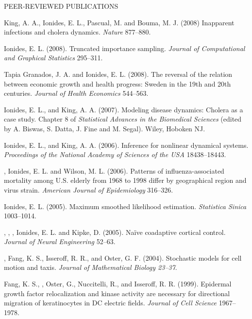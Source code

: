 \begin{reflist}{PEER-REVIEWED PUBLICATIONS}
\item\formal{[[\kingNATURE] ]}
King, A. A., Ionides, E. L., Pascual, M. and Bouma, M. J. (2008) Inapparent infections and cholera dynamics. {\em Nature} {}{\separator}877--880.

\item\formal{[[\ionidesJCGS] ]}
Ionides, E. L. (2008). Truncated importance sampling. {\em Journal of Computational and Graphical Statistics} {}{\separator}295--311.

\item\formal{[[\tapiaJHE] ]} 
Tapia Granados, J. A. and Ionides, E. L. (2008). The reversal of the relation between economic growth and health progress: Sweden in the 19th and 20th centuries. {\em Journal of Health Economics} {}{\separator}544--563.

\item\formal{[[\ionidesBOOK] ]}  
Ionides, E. L.,  and King, A. A. (2007). 
 Modeling disease dynamics: Cholera as a case study.
 Chapter 8 of {\em  Statistical Advances in the Biomedical Sciences} (edited by A. Biswas, S. Datta, J. Fine and M. Segal). Wiley, Hoboken NJ.


\item\formal{[[\ionidesPNAS] ]}  
Ionides, E. L.,  and King, A. A. (2006). 
 Inference for nonlinear dynamical systems.
 {\em Proceedings of the National Academy of Sciences of the USA} {}{\separator}18438--18443.


\item\formal{[[\greeneAJE] ]} 
, Ionides, E. L. and Wilson,
  M. L. (2006). Patterns of influenza-associated mortality among
  U.S. elderly from 1968 to 1998 differ by geographical region
  and virus strain. {\em American Journal of
  Epidemiology} {}{\separator}316--326. 


\item\formal{[[\ionidesSINICA] ]} 
Ionides, E. L. (2005). Maximum smoothed likelihood estimation.
 {\em Statistica Sinica} {}{\separator}1003--1014.


\item\formal{[[\gageJNE] ]}  
,  , 
   , Ionides, E. L. and
  Kipke, D. (2005). Na\"{i}ve coadaptive cortical control. 
  {\em Journal of Neural Engineering} {}{\separator}52--63. 


\item\formal{[[\ionidesJMB] ]}  
 ,  Fang, K. S.,  Isseroff, R. R., and  Oster, G. F. (2004).  Stochastic models for cell motion and taxis. {\em
 Journal of Mathematical Biology {}{\separator}23--37}.


\item\formal{[[\fangJCS] ]}  
 Fang, K. S.,  ,  Oster, G.,  
Nuccitelli, R.,   and Isseroff, R. R. (1999). Epidermal growth factor 
relocalization and kinase activity are necessary for directional
migration of keratinocytes in DC electric fields. 
{\em Journal of Cell Science} {}{\separator}1967--1978.
\end{reflist}


